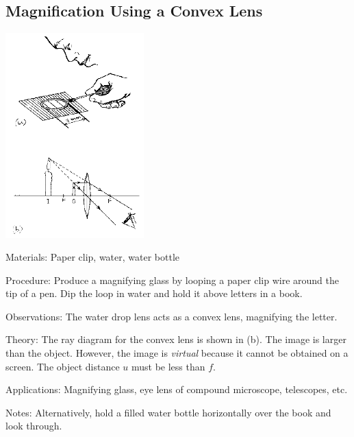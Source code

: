 \begin{multicols}{2}
\subsection{Magnification Using a Convex Lens}

\begin{center}
\includegraphics[width=0.4\textwidth]{./img/source/magnification-convex.png}
\end{center}

\begin{description*}
\item[Materials:]{Paper clip, water, water bottle}
\item[Procedure:]{Produce a magnifying glass by looping a paper clip wire around the tip of a pen. Dip the loop in water and hold it above letters in a book.}
\item[Observations:]{The water drop lens acts as a convex lens, magnifying the letter.}
\item[Theory:]{The ray diagram for the convex lens is shown in (b). The image is larger than the object. However, the image is \emph{virtual} because it cannot be obtained on a screen. The object distance $u$ must be less than $f$.}
\item[Applications:]{Magnifying glass, eye lens of compound microscope, telescopes, etc.}
\item[Notes:]{Alternatively, hold a filled water bottle horizontally over the book and look through.}
\end{description*}



\end{multicols}
